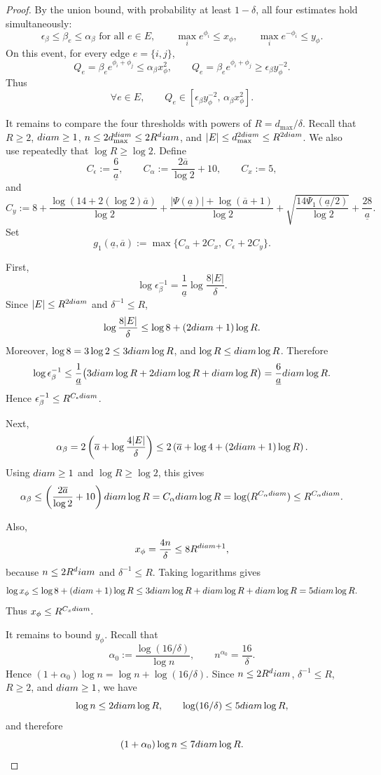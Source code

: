 \documentclass[10pt,a4paper]{amsart}
\newcommand{\diam}{\textnormal{diam}}
\begin{document}
\begin{proof}
By the union bound, with probability at least $1-\delta$, all four estimates hold simultaneously:
\[
\epsilon_\beta\le\beta_e\le\alpha_\beta\text{ for all }e\in E,
\qquad
\max_i e^{\phi_i}\le x_\phi,
\qquad
\max_i e^{-\phi_i}\le y_\phi.
\]
On this event, for every edge $e=\{i,j\}$,
\[
Q_e=\beta_e e^{\phi_i+\phi_j}
\le
\alpha_\beta x_\phi^2,
\qquad
Q_e=\beta_e e^{\phi_i+\phi_j}
\ge
\epsilon_\beta y_\phi^{-2}.
\]
Thus
\begin{equation}
\label{eqn:Q-real-thresholds}
\forall e\in E,\qquad
Q_e\in[\epsilon_\beta y_\phi^{-2},\,\alpha_\beta x_\phi^2].
\end{equation}


It remains to compare the four thresholds with powers of \(R=d_{\max}/\delta\).
Recall that \(R\ge2\), \(\diam\ge1\), \(n\le2d_{\max}^{\diam}\le2R^\diam\), and
\(|E|\le d_{\max}^{2\diam}\le R^{2\diam}\). We also use repeatedly that
\(\log R\ge\log2\). Define
\[
C_\epsilon:=\frac{6}{\underline a},
\qquad
C_\alpha:=\frac{2\overline a}{\log2}+10,
\qquad
C_x:=5,
\]
and
\[
C_y
:=
8
+
\frac{\log(14+2(\log2)\overline a)}{\log2}
+
\frac{|\Psi(\underline a)|+\log(\overline a+1)}{\log2}
+
\sqrt{\frac{14\Psi_1(\underline a/2)}{\log2}}
+
\frac{28}{\underline a}.
\]
Set
\[
g_1(\underline a,\overline a)
:=
\max\{C_\alpha+2C_x,\ C_\epsilon+2C_y\}.
\]

First,
\[
\log\epsilon_\beta^{-1}
=
\frac{1}{\underline a}\log\frac{8|E|}{\delta}.
\]
Since \(|E|\le R^{2\diam}\) and \(\delta^{-1}\le R\),
\[
\log\frac{8|E|}{\delta}
\le
\log 8+(2\diam+1)\log R.
\]
Moreover, \(\log 8=3\log2\le3\diam\log R\), and
\(\log R\le\diam\log R\). Therefore
\[
\log\epsilon_\beta^{-1}
\le
\frac{1}{\underline a}\bigl(3\diam\log R+2\diam\log R+\diam\log R\bigr)
=
\frac{6}{\underline a}\diam\log R.
\]
Hence $\epsilon_\beta^{-1}\le R^{C_\epsilon\diam}$.

Next,
\[
\alpha_\beta
=
2\left(\overline a+\log\frac{4|E|}{\delta}\right)
\le
2\left(\overline a+\log4+(2\diam+1)\log R\right).
\]
Using \(\diam\ge1\) and \(\log R\ge\log2\), this gives
\[
\alpha_\beta
\le
\left(\frac{2\overline a}{\log2}+10\right)\diam\log R = C_\alpha\diam\log R = \log (R^{C_\alpha\diam}) \le R^{C_\alpha\diam}.
\]

Also,
\[
x_\phi=\frac{4n}{\delta}
\le
8R^{\diam+1},
\]
because \(n\le2R^\diam\) and \(\delta^{-1}\le R\). Taking logarithms gives
\[
\log x_\phi
\le
\log8+(\diam+1)\log R
\le
3\diam\log R+\diam\log R+\diam\log R
=
5\diam\log R.
\]
Thus
\(
x_\phi\le R^{C_x\diam}.
\)

It remains to bound \(y_\phi\). Recall that
\[
\alpha_0:=\frac{\log(16/\delta)}{\log n},
\qquad
n^{\alpha_0}=\frac{16}{\delta}.
\]
Hence \((1+\alpha_0)\log n=\log n+\log(16/\delta)\). Since \(n\le2R^\diam\),
\(\delta^{-1}\le R\), \(R\ge2\), and \(\diam\ge1\), we have
\[
\log n\le2\diam\log R,
\qquad
\log(16/\delta)\le5\diam\log R,
\]
and therefore
\[
(1+\alpha_0)\log n\le7\diam\log R.
\]


\end{proof}
\end{document}
